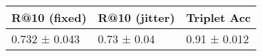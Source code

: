 \begin{tabular}{lll}
\toprule
 R@10 (fixed) & R@10 (jitter) &  Triplet Acc \\
\midrule
0.732 ± 0.043 &   0.73 ± 0.04 & 0.91 ± 0.012 \\
\bottomrule
\end{tabular}
